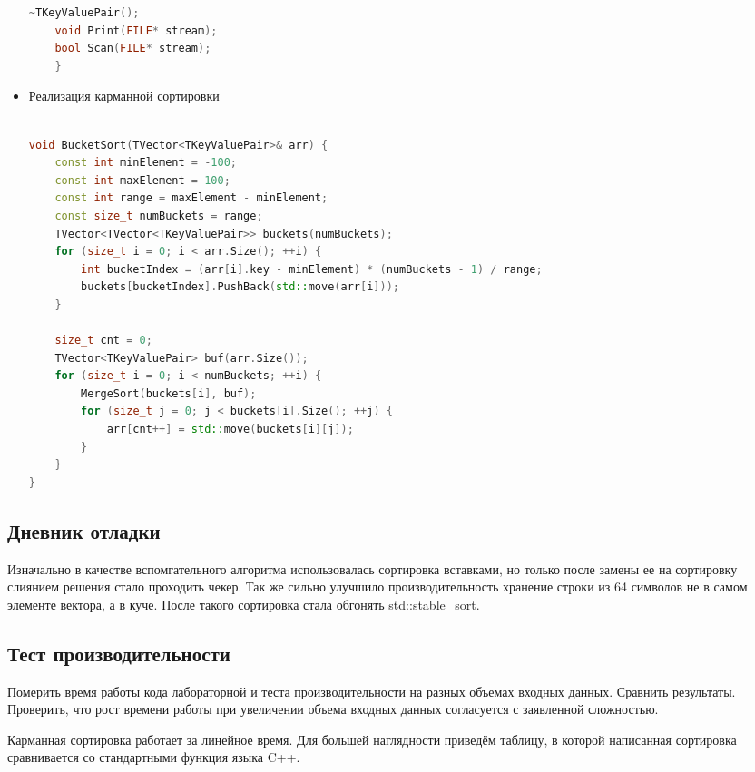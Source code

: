 \documentclass[12pt]{article}
\begin{document}
\begin{itemize}
\begin{lstlisting}[language=C++]
    ~TKeyValuePair();
    void Print(FILE* stream);
    bool Scan(FILE* stream);
    }
        \end{lstlisting}
    \item
        Реализация карманной сортировки
        \begin{lstlisting}[language=C++]

void BucketSort(TVector<TKeyValuePair>& arr) {
    const int minElement = -100;
    const int maxElement = 100;
    const int range = maxElement - minElement;
    const size_t numBuckets = range;
    TVector<TVector<TKeyValuePair>> buckets(numBuckets);
    for (size_t i = 0; i < arr.Size(); ++i) {
        int bucketIndex = (arr[i].key - minElement) * (numBuckets - 1) / range;
        buckets[bucketIndex].PushBack(std::move(arr[i]));
    }

    size_t cnt = 0;
    TVector<TKeyValuePair> buf(arr.Size());
    for (size_t i = 0; i < numBuckets; ++i) {
        MergeSort(buckets[i], buf);
        for (size_t j = 0; j < buckets[i].Size(); ++j) {
            arr[cnt++] = std::move(buckets[i][j]);
        }
    }
}
        \end{lstlisting}
\end{itemize}

\subsection*{Дневник отладки}

Изначально в качестве вспомгательного алгоритма использовалась сортировка вставками, но только после замены ее на сортировку слиянием решения стало проходить чекер.
Так же сильно улучшило производительность хранение строки из 64 символов не в самом элементе вектора, а в куче. После такого сортировка стала обгонять std::stable\_sort.

\subsection*{Тест производительности}

Померить время работы кода лабораторной и теста производительности
на разных объемах входных данных. Сравнить результаты. Проверить,
что рост времени работы при увеличении объема входных данных
согласуется с заявленной сложностью.

Карманная сортировка работает за линейное время. Для большей наглядности приведём таблицу, в которой написанная сортировка сравнивается со стандартными функция языка C++.
\end{document}
